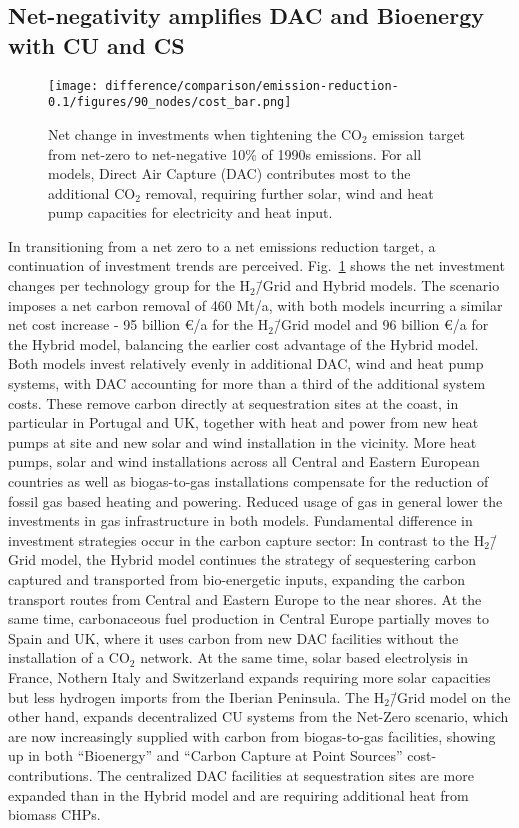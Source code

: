 \documentclass[twocolumn]{article}
\newcommand{\COtwo}{CO$_2$}
\newcommand{\Hgrid}{H$_2$\=/Grid}
\newcommand{\modH}{H$_2$\=/Grid model}
\newcommand{\modHybrid}{Hybrid model}
\newcommand{\carbon}{CO$_2$}
\begin{document}
\subsection*{Net-negativity amplifies DAC and Bioenergy with CU and CS}\label{subsec:NN}

\begin{figure}[htb!]
    \centering
    \texttt{[image: difference/comparison/emission-reduction-0.1/figures/90\_nodes/cost\_bar.png]}
    \caption[short]{Net change in investments when tightening the \COtwo{} emission target from net-zero to net-negative 10\% of 1990s emissions. For all models, Direct Air Capture (DAC) contributes most to the additional \carbon{} removal, requiring further solar, wind and heat pump capacities for electricity and heat input.}
    \label{fig:net-negative_cost_bar}
\end{figure}


In transitioning from a net zero to a net emissions reduction target, a continuation of investment trends are perceived. Fig.~\ref{fig:net-negative_cost_bar} shows the net investment changes per technology group for the \Hgrid{} and \modHybrid{}s. The scenario imposes a net carbon removal of 460 Mt/a, with both models incurring a similar net cost increase - 95 billion €/a for the \modH{} and 96 billion €/a for the \modHybrid{}, balancing the earlier cost advantage of the \modHybrid{}. Both models invest relatively evenly in additional DAC, wind and heat pump systems, with DAC accounting for more than a third of the additional system costs. These remove carbon directly at sequestration sites at the coast, in particular in Portugal and UK, together with heat and power from new heat pumps at site and new solar and wind installation in the vicinity.
More heat pumps, solar and wind installations across all Central and Eastern European countries as well as biogas-to-gas installations compensate for the reduction of fossil gas based heating and powering. Reduced usage of gas in general lower the investments in gas infrastructure in both models.
Fundamental difference in investment strategies occur in the carbon capture sector: In contrast to the \modH{}, the \modHybrid{} continues the strategy of sequestering carbon captured and transported from bio-energetic inputs, expanding the carbon transport routes from Central and Eastern Europe to the near shores. At the same time, carbonaceous fuel production in Central Europe partially moves to Spain and UK, where it uses carbon from new DAC facilities without the installation of a \COtwo{} network. At the same time, solar based electrolysis in France, Nothern Italy and Switzerland expands requiring more solar capacities but less hydrogen imports from the Iberian Peninsula.
The \modH{} on the other hand, expands decentralized CU systems from the Net-Zero scenario, which are now increasingly supplied with carbon from biogas-to-gas facilities, showing up in both ``Bioenergy'' and ``Carbon Capture at Point Sources'' cost-contributions. The centralized DAC facilities at sequestration sites are more expanded than in the \modHybrid{} and are requiring additional heat from biomass CHPs.
\end{document}
